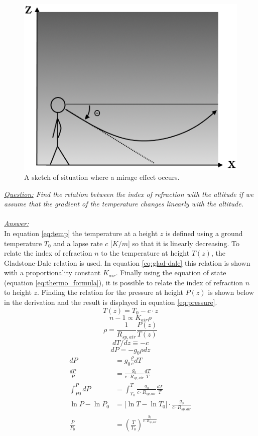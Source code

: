 \documentclass{article}
\begin{document}
\begin{figure}[h!]
	\centering
	\includegraphics[width=0.4\linewidth,keepaspectratio]{afbeeldingen/miraaj.png}
	\caption{A sketch of situation where a mirage effect occurs.}
	\label{fig:mirage}
\end{figure}
\textit{\underline{Question:} Find the relation between the index of refraction with the altitude if we assume that the gradient of the temperature changes linearly with the altitude.}\\
\\
\textit{\underline{Answer:}} \\
In equation \ref{eq:temp} the temperature at a height $z$ is defined using a ground temperature $T_0$ and a lapse rate $c$ [$K /m$] so that it is linearly decreasing. To relate the index of refraction $n$ to the temperature at height $T(z)$, the Gladstone-Dale relation is used. In equation \ref{eq:glad-dale} this relation is shown with a proportionality constant $K_{air}$. Finally using the equation of state (equation \ref{eq:thermo_formula}), it is possible to relate the index of refraction $n$ to height $z$. Finding the relation for the pressure at height $P(z)$ is shown below in the derivation and the result is displayed in equation \ref{eq:pressure}.\\
\begin{equation}
	T(z) = T_0 - c \cdot z
	\label{eq:temp}
\end{equation}
\begin{equation}
	n-1 \propto K_{air} \rho
	\label{eq:glad-dale}
\end{equation}
\begin{equation}
	\rho = \frac{1}{R_{sp,air}} \frac{P(z)}{T(z)}
	\label{eq:thermo_formula}
\end{equation}
\begin{equation*}
	dT/dz \equiv -c
\end{equation*}
\begin{equation*}
	dP = -g_0 \rho dz
\end{equation*}
\begin{align*}
	dP &= g_0 \frac{\rho}{c} dT\\
	\frac{dP}{P} &= \frac{g_0}{c\cdot R_{sp,air}}\frac{dT}{T}\\
	\int_{P0}^P dP &= \int_{T_0}^T \frac{g_0}{c\cdot R_{sp,air}}\frac{dT}{T}\\
	\ln{P}-\ln{P_0} &= \big[\ln{T} - \ln{T_0}\big] \cdot \frac{g_0}{c\cdot R_{sp,air}}\\
	\frac{P}{P_0} &= (\frac{T}{T_0})^{\frac{g_0}{c\cdot R_{sp,air}}}
\end{align*}
\end{document}
